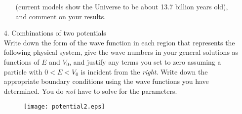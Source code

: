 \documentclass[11pt]{article}
\begin{document}
\begin{itemize}
\begin{itemize}
(current models show the Universe to be about 13.7 billion years old), and comment on your results.
\end{itemize}
%
\item[4.] Combinations of two potentials\\
Write down the form of the wave function in each region that represents the following physical system,
give the wave numbers in your general solutions as functions of $E$ and $V_0$, and justify any terms
you set to zero assuming a particle with $0<E<V_0$ is incident from the {\it right}. Write down the appropriate boundary conditions using the wave functions you have determined. You do {\it not} have to solve for the parameters.

\begin{figure}[h]
\centerline{\texttt{[image: potential2.eps]}}
\end{figure}

%
\end{itemize}
\end{document}
